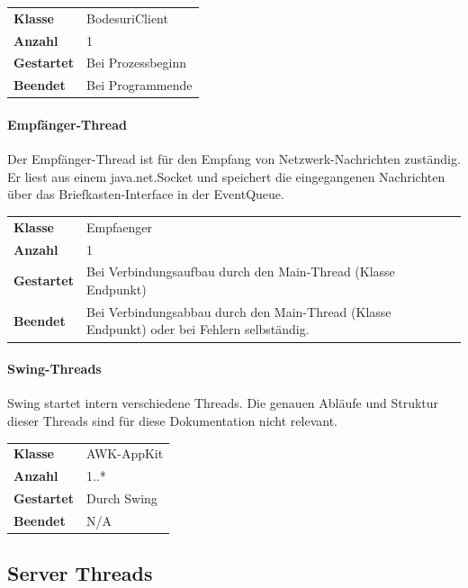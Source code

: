 \documentclass[12pt,halfparskip]{scrartcl}
\begin{document}
\begin{tabular}{@{} l p{12.5cm}}
\textbf{Klasse}       & BodesuriClient \\
\textbf{Anzahl}       & 1 \\
\textbf{Gestartet}    & Bei Prozessbeginn \\
\textbf{Beendet}      & Bei Programmende
\end{tabular}

\paragraph{Empfänger-Thread}

Der Empfänger-Thread ist für den Empfang von Netzwerk-Nachrichten zuständig. Er liest aus einem java.net.Socket und speichert die eingegangenen Nachrichten über das Briefkasten-Interface in der EventQueue.

\begin{tabular}{@{} l p{12.5cm}}
\textbf{Klasse}       & Empfaenger \\
\textbf{Anzahl}       & 1 \\
\textbf{Gestartet}    & Bei Verbindungsaufbau durch den Main-Thread (Klasse Endpunkt) \\
\textbf{Beendet}      & Bei Verbindungsabbau durch den Main-Thread (Klasse Endpunkt) oder bei Fehlern selbständig.
\end{tabular}


\paragraph{Swing-Threads}
\label{ssub:swing_threads}

Swing startet intern verschiedene Threads. Die genauen Abläufe und Struktur dieser Threads sind für diese Dokumentation nicht relevant.

\begin{tabular}{@{} l p{12.5cm}}
\textbf{Klasse}       & AWK-AppKit \\
\textbf{Anzahl}       & 1..* \\
\textbf{Gestartet}    & Durch Swing \\
\textbf{Beendet}      & N/A

\end{tabular}

\clearpage
\subsection{Server Threads}
\label{ssub:server}
\end{document}
